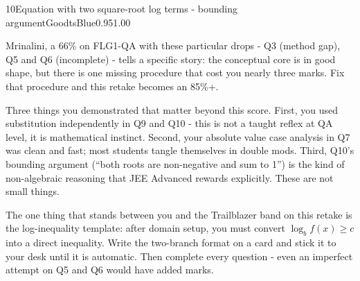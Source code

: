 \documentclass[11pt,a4paper]{article}
\begin{document}
\begin{tsQCard}{10}{Equation with two square-root log terms - bounding argument}{Good}{tsBlue}{0.95}{1.00}
\end{tsQCard}


Mrinalini, a 66\% on FLG1-QA with these particular drops - Q3 (method gap), Q5 and Q6 (incomplete) - tells a specific story: the conceptual core is in good shape, but there is one missing procedure that cost you nearly three marks. Fix that procedure and this retake becomes an 85\%+.

\par\vspace{0.2cm}
Three things you demonstrated that matter beyond this score. First, you used substitution independently in Q9 and Q10 - this is not a taught reflex at QA level, it is mathematical instinct. Second, your absolute value case analysis in Q7 was clean and fast; most students tangle themselves in double mods. Third, Q10's bounding argument (``both roots are non-negative and sum to 1'') is the kind of non-algebraic reasoning that JEE Advanced rewards explicitly. These are not small things.

\par\vspace{0.2cm}
The one thing that stands between you and the Trailblazer band on this retake is the log-inequality template: after domain setup, you must convert $\log_{b}f(x) \geq c$ into a direct inequality. Write the two-branch format on a card and stick it to your desk until it is automatic. Then complete every question - even an imperfect attempt on Q5 and Q6 would have added marks.
\end{document}
